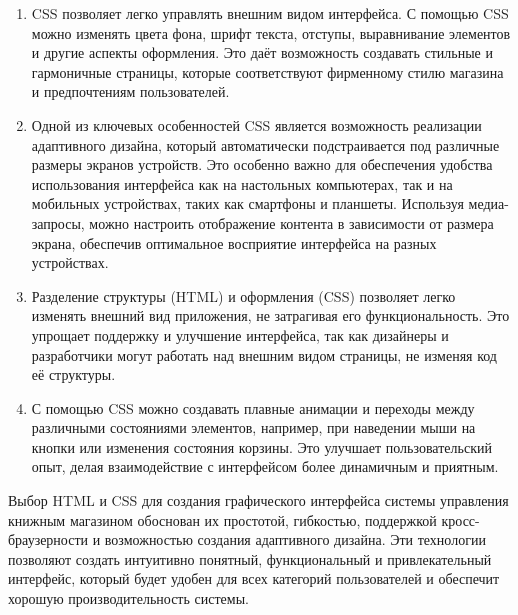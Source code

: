 \begin{enumerate}
	\item CSS позволяет легко управлять внешним видом интерфейса. С помощью CSS можно изменять цвета фона, шрифт текста, отступы, выравнивание элементов и другие аспекты оформления. Это даёт возможность создавать стильные и гармоничные страницы, которые соответствуют фирменному стилю магазина и предпочтениям пользователей.
	\item Одной из ключевых особенностей CSS является возможность реализации адаптивного дизайна, который автоматически подстраивается под различные размеры экранов устройств. Это особенно важно для обеспечения удобства использования интерфейса как на настольных компьютерах, так и на мобильных устройствах, таких как смартфоны и планшеты. Используя медиа-запросы, можно настроить отображение контента в зависимости от размера экрана, обеспечив оптимальное восприятие интерфейса на разных устройствах.
	\item Разделение структуры (HTML) и оформления (CSS) позволяет легко изменять внешний вид приложения, не затрагивая его функциональность. Это упрощает поддержку и улучшение интерфейса, так как дизайнеры и разработчики могут работать над внешним видом страницы, не изменяя код её структуры.
	\item С помощью CSS можно создавать плавные анимации и переходы между различными состояниями элементов, например, при наведении мыши на кнопки или изменения состояния корзины. Это улучшает пользовательский опыт, делая взаимодействие с интерфейсом более динамичным и приятным.
\end{enumerate}


Выбор HTML и CSS для создания графического интерфейса системы управления книжным магазином обоснован их простотой, гибкостью, поддержкой кросс-браузерности и возможностью создания адаптивного дизайна. Эти технологии позволяют создать интуитивно понятный, функциональный и привлекательный интерфейс, который будет удобен для всех категорий пользователей и обеспечит хорошую производительность системы.